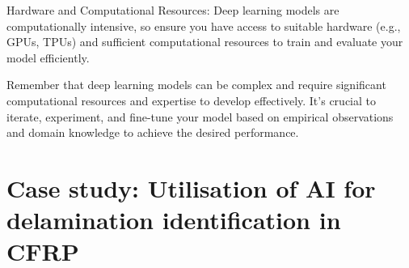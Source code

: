 \documentclass[10pt,aspectratio=169,dvipsnames]{beamer} %
\begin{document}
{		
		Hardware and Computational Resources: Deep learning models are computationally intensive, so ensure you have access to suitable hardware (e.g., GPUs, TPUs) and sufficient computational resources to train and evaluate your model efficiently.
		
		
		Remember that deep learning models can be complex and require significant computational resources and expertise to develop effectively. It's crucial to iterate, experiment, and fine-tune your model based on empirical observations and domain knowledge to achieve the desired performance.}
	\setcounter{subfigure}{0}
	\section{Case study: Utilisation of AI for delamination identification in CFRP}
\end{document}
